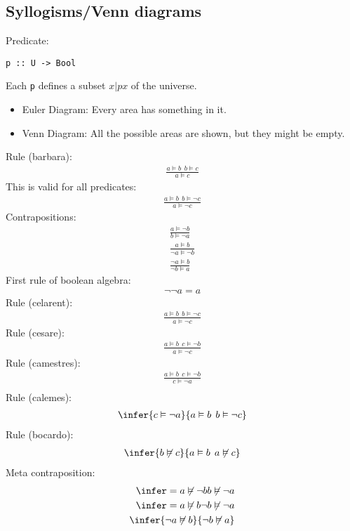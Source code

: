 \documentclass{article}
\begin{document}
\subsection{Syllogisms/Venn diagrams}
Predicate:
\begin{verbatim}
p :: U -> Bool
\end{verbatim}
Each \texttt{p} defines a subset ${ x | p x }$ of the universe.\\
\begin{itemize}
	\item Euler Diagram: Every area has something in it.
	\item Venn Diagram: All the possible areas are shown, but they might be empty.
\end{itemize}
Rule (barbara):
\begin{align}
	\frac{a \vDash b\:\: b \vDash c}{a \vDash c}
\end{align}
This is valid for all predicates:
\begin{align}
	\frac{a \vDash b\:\: b \vDash \neg c}{a \vDash \neg c}
\end{align}
Contrapositions:
\begin{align}
	\frac{a \vDash \neg b}{b \vDash \neg a} \\
	\frac{a \vDash b}{\neg a \vDash \neg b} \\
	\frac{\neg a \vDash b}{\neg b \vDash a}
\end{align}
First rule of boolean algebra:
\begin{align}
	\neg \neg a = a
\end{align}
Rule (celarent):
\begin{align}
	\frac{a \vDash b \:\: b \vDash \neg c}{a \vDash \neg c}
\end{align}
Rule (cesare):
\begin{align}
	\frac{a \vDash b \:\: c \vDash \neg b}{a \vDash \neg c}
\end{align}
Rule (camestres):
\begin{align}
	\frac{a\vDash b \:\: c\vDash \neg b}{c \vDash \neg a} \\
\end{align}
Rule (calemes):
\begin{align}
	\infer{c \vDash \neg a}{a\vDash b \:\: b\vDash \neg c}
\end{align}
Rule (bocardo):
\begin{align}
	\infer{b \not\vDash c}{a\vDash b\:\:a\not\vDash c}
\end{align}
Meta contraposition:
\begin{align}
	\infer={
	a\not\vDash \neg b
	}{
	b\not\vDash \neg a
	}                                                \\
	\infer={a\not\vDash b}{\neg b \not\vDash \neg a} \\
	\infer{\neg a \not\vDash b}{\neg b \not\vDash a}
\end{align}
\end{document}
